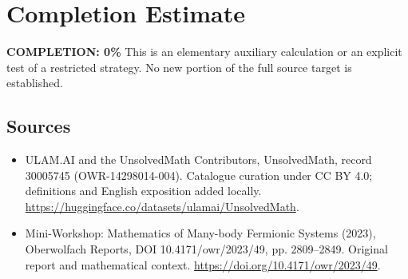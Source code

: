 \documentclass[11pt]{article}
\begin{document}
\section{Completion Estimate}
\noindent\textbf{COMPLETION: 0\%}
This is an elementary auxiliary calculation or an explicit test of a restricted strategy. No new portion of the full source target is established.

\subsection{Sources}
\begin{itemize}
\item[\hypertarget{source:30005745:1}{S1}] ULAM.AI and the UnsolvedMath Contributors, UnsolvedMath, record 30005745 (OWR-14298014-004). Catalogue curation under CC BY 4.0; definitions and English exposition added locally.
\url{https://huggingface.co/datasets/ulamai/UnsolvedMath}.
\item[\hypertarget{source:30005745:2}{S2}] Mini-Workshop: Mathematics of Many-body Fermionic Systems (2023), Oberwolfach Reports, DOI 10.4171/owr/2023/49, pp. 2809--2849. Original report and mathematical context.
\url{https://doi.org/10.4171/owr/2023/49}.
\end{itemize}
\label{end:30005745}
\end{document}
